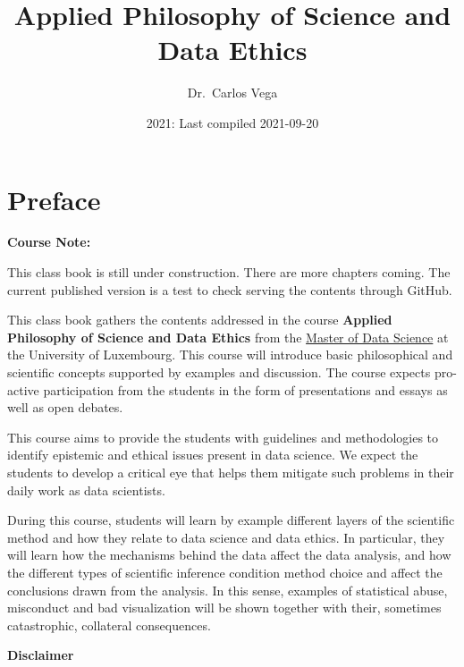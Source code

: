 \documentclass[
]{book}
\title{Applied Philosophy of Science and Data Ethics}
\author{Dr.~Carlos Vega}
\date{2021: Last compiled 2021-09-20}
\begin{document}
\maketitle

{
\hypersetup{linkcolor=}
\setcounter{tocdepth}{3}
\tableofcontents
}
\hypertarget{preface}{%
\chapter*{Preface}\label{preface}}

\begin{notebox}

\begin{center}
\textbf{Course Note:}

\end{center}

This class book is still under construction. There are more chapters coming. The current published version is a test to check serving the contents through GitHub.

\end{notebox}

This class book gathers the contents addressed in the course \textbf{Applied Philosophy of Science and Data Ethics} from the \href{https://wwwfr.uni.lu/formations/fstm/master_of_data_science}{Master of Data Science} at the University of Luxembourg. This course will introduce basic philosophical and scientific concepts supported by examples and discussion. The course expects pro-active participation from the students in the form of presentations and essays as well as open debates.

This course aims to provide the students with guidelines and methodologies to identify epistemic and ethical issues present in data science. We expect the students to develop a critical eye that helps them mitigate such problems in their daily work as data scientists.

During this course, students will learn by example different layers of the scientific method and how they relate to data science and data ethics. In particular, they will learn how the mechanisms behind the data affect the data analysis, and how the different types of scientific inference condition method choice and affect the conclusions drawn from the analysis. In this sense, examples of statistical abuse, misconduct and bad visualization will be shown together with their, sometimes catastrophic, collateral consequences.

\textbf{Disclaimer}
\end{document}
